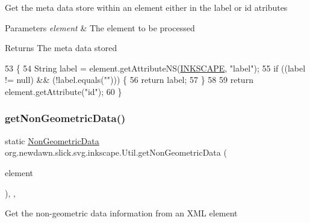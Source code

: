 Get the meta data store within an element either in the label or id atributes


\begin{DoxyParams}{Parameters}
{\em element} & The element to be processed \\
\hline
\end{DoxyParams}
\begin{DoxyReturn}{Returns}
The meta data stored 
\end{DoxyReturn}

\begin{DoxyCode}
53                                                \{
54         String label = element.getAttributeNS(\mbox{\hyperlink{classorg_1_1newdawn_1_1slick_1_1svg_1_1inkscape_1_1_util_af7a7fcda04b0fd373a2ed92aa5e26cdc}{INKSCAPE}}, \textcolor{stringliteral}{"label"});
55         \textcolor{keywordflow}{if} ((label != null) && (!label.equals(\textcolor{stringliteral}{""}))) \{
56             \textcolor{keywordflow}{return} label;
57         \}
58         
59         \textcolor{keywordflow}{return} element.getAttribute(\textcolor{stringliteral}{"id"});
60     \}
\end{DoxyCode}
\mbox{\label{classorg_1_1newdawn_1_1slick_1_1svg_1_1inkscape_1_1_util_aa784c3edeb4aad8fc26ec54e4f8c7d04}} 
\subsubsection{\texorpdfstring{get\+Non\+Geometric\+Data()}{getNonGeometricData()}}
{\footnotesize\ttfamily static \mbox{\hyperlink{classorg_1_1newdawn_1_1slick_1_1svg_1_1_non_geometric_data}{Non\+Geometric\+Data}} org.\+newdawn.\+slick.\+svg.\+inkscape.\+Util.\+get\+Non\+Geometric\+Data (\begin{DoxyParamCaption}\item[{Element}]{element }\end{DoxyParamCaption})\hspace{0.3cm}{\ttfamily [inline]}, {\ttfamily [static]}, {\ttfamily [package]}}

Get the non-\/geometric data information from an X\+ML element


